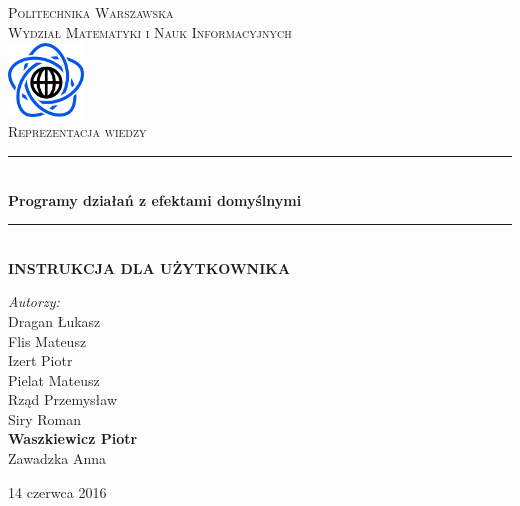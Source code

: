 \documentclass{article}
\begin{document}
	
\begin{titlepage}

\newcommand{\HRule}{\rule{\linewidth}{0.5mm}}

\begin{center}

\textsc{\LARGE Politechnika Warszawska}\\[0.5cm]
\textsc{\Large Wydział Matematyki i Nauk Informacyjnych}\\[1cm]

\includegraphics[width=2cm, height=2cm]{logo}\\[1cm]


\textsc{\Huge Reprezentacja wiedzy}\\[0.4cm]


\HRule \\[0.4cm]
{ \LARGE \bfseries Programy działań z efektami domyślnymi}\\[0.2cm]
 

\HRule \\[0.4cm]
{  \bfseries INSTRUKCJA DLA UŻYTKOWNIKA}\\[1.5cm]

\begin{flushright}
\Large \emph{Autorzy:}\\[0.5cm]
Dragan Łukasz\\
Flis Mateusz\\
Izert Piotr\\
Pielat Mateusz\\
Rząd Przemysław\\
Siry Roman\\
\textbf{Waszkiewicz Piotr}\\
Zawadzka Anna\\[0.9cm]

\end{flushright}

\vfill
{\large 14 czerwca 2016}\\[1cm]
	
\end{center}

\end{titlepage}
\end{document}
